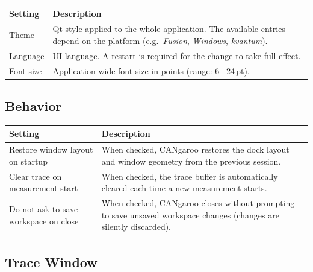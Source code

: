\documentclass[a4paper,11pt]{article}
\begin{document}
\begin{table}[h]
  \centering
  \begin{tabularx}{\textwidth}{lX}
    \toprule
    \textbf{Setting} & \textbf{Description} \\
    \midrule
    Theme     & Qt style applied to the whole application.
                The available entries depend on the platform
                (e.g.\ \textit{Fusion}, \textit{Windows}, \textit{kvantum}). \\
    Language  & UI language. A restart is required for the change to take full
                effect. \\
    Font size & Application-wide font size in points (range: 6\,--\,24\,pt). \\
    \bottomrule
  \end{tabularx}
\end{table}

\subsection*{Behavior}

\begin{table}[h]
  \centering
  \begin{tabularx}{\textwidth}{lX}
    \toprule
    \textbf{Setting} & \textbf{Description} \\
    \midrule
    Restore window layout on startup
      & When checked, CANgaroo restores the dock layout and window
        geometry from the previous session. \\
    Clear trace on measurement start
      & When checked, the trace buffer is automatically cleared each time
        a new measurement starts. \\
    Do not ask to save workspace on close
      & When checked, CANgaroo closes without prompting to save unsaved
        workspace changes (changes are silently discarded). \\
    \bottomrule
  \end{tabularx}
\end{table}

\subsection*{Trace Window}
\end{document}
